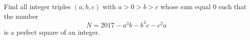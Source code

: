 Find all integer triples $(a,b,c)$ with $a>0>b>c$ whose sum equal $0$ such that the number
$$N=2017-a^3b-b^3c-c^3a$$is a perfect square of an integer.